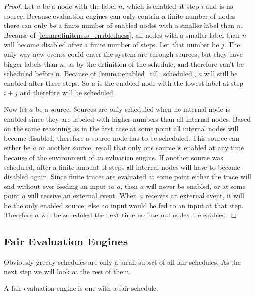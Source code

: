 \begin{proof}
  Let \(a\) be a node with the label \(n\), which is enabled at step \(i\) and is no source.
  Because evaluation engines can only contain a finite number of nodes there can only be a finite number of enabled nodes with a smaller label than \(n\).
  Because of \cref{lemma:finiteness_enabledness}, all nodes with a smaller label than \(n\) will become disabled after a finite number of steps.
  Let that number be \(j\).
  The only way new events could enter the system are through sources, but they have bigger labels than \(n\), as by the definition of the schedule, and therefore can't be scheduled before \(n\).
  Because of \cref{lemma:enabled_till_scheduled}, \(a\) will still be enabled after these steps.
  So \(a\) is the enabled node with the lowest label at step \(i + j\) and therefore will be scheduled.

  Now let \(a\) be a source.
  Sources are only scheduled when no internal node is enabled since they are labeled with higher numbers than all internal nodes.
  Based on the same reasoning as in the first case at some point all internal nodes will become disabled, therefore a source node has to be scheduled.
  This source can either be \(a\) or another source, recall that only one source is enabled at any time because of the environment of an evluation engine.
  If another source was scheduled, after a finite amount of steps all internal nodes will have to become disabled again.
  Since finite traces are evaluated at some point either the trace will end without ever feeding an input to \(a\), then \(a\) will never be enabled, or at some point \(a\) will receive an external event.
  When \(a\) receives an external event, it will be the only enabled source, else no input would be fed to an input at that step.
  Therefore \(a\) will be scheduled the next time no internal nodes are enabled.
\end{proof}


\subsection{Fair Evaluation Engines}
\label{sec:behaviours:behaviour_without_timing:fair}

Obviously greedy schedules are only a small subset of all fair schedules.
As the next step we will look at the rest of them.

\begin{definition}[name = Fair Evaluation Engines]\label{def:fair_evaluation_engines}
  A fair evaluation engine is one with a fair schedule.
\end{definition}


